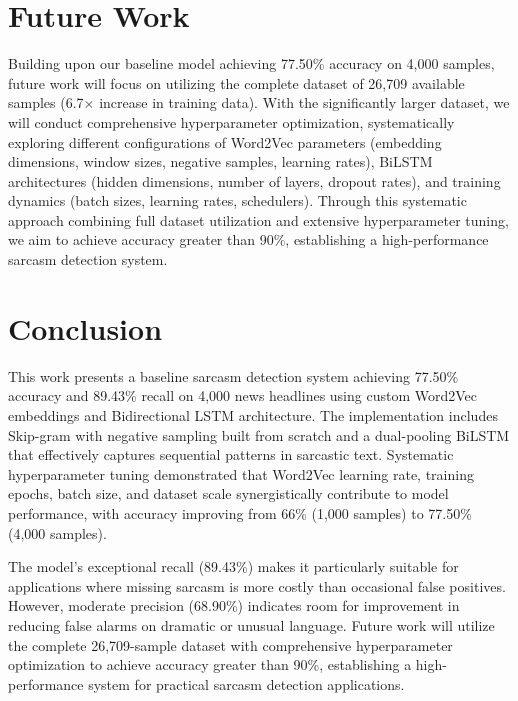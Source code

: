\documentclass[11pt]{article}
\begin{document}
\section{Future Work}

Building upon our baseline model achieving 77.50\% accuracy on 4,000 samples, future work will focus on utilizing the complete dataset of 26,709 available samples (6.7× increase in training data). With the significantly larger dataset, we will conduct comprehensive hyperparameter optimization, systematically exploring different configurations of Word2Vec parameters (embedding dimensions, window sizes, negative samples, learning rates), BiLSTM architectures (hidden dimensions, number of layers, dropout rates), and training dynamics (batch sizes, learning rates, schedulers). Through this systematic approach combining full dataset utilization and extensive hyperparameter tuning, we aim to achieve accuracy greater than 90\%, establishing a high-performance sarcasm detection system.

\section{Conclusion}

This work presents a baseline sarcasm detection system achieving 77.50\% accuracy and 89.43\% recall on 4,000 news headlines using custom Word2Vec embeddings and Bidirectional LSTM architecture. The implementation includes Skip-gram with negative sampling built from scratch and a dual-pooling BiLSTM that effectively captures sequential patterns in sarcastic text. Systematic hyperparameter tuning demonstrated that Word2Vec learning rate, training epochs, batch size, and dataset scale synergistically contribute to model performance, with accuracy improving from 66\% (1,000 samples) to 77.50\% (4,000 samples).

The model's exceptional recall (89.43\%) makes it particularly suitable for applications where missing sarcasm is more costly than occasional false positives. However, moderate precision (68.90\%) indicates room for improvement in reducing false alarms on dramatic or unusual language. Future work will utilize the complete 26,709-sample dataset with comprehensive hyperparameter optimization to achieve accuracy greater than 90\%, establishing a high-performance system for practical sarcasm detection applications.
\end{document}

